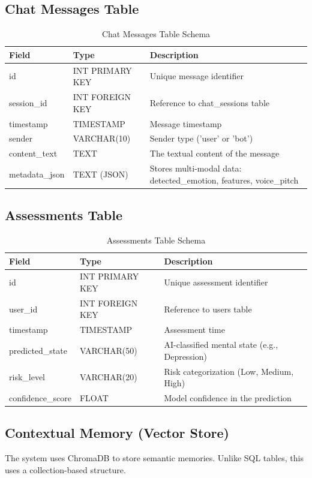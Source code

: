 \subsection{Chat Messages Table}
\begin{table}[H]
\centering
\caption{Chat Messages Table Schema}
\label{tab:messages_table}
\begin{tabular}{|p{3cm}|p{3cm}|p{9cm}|}
\hline
Field & Type & Description \\ \hline
id & INT PRIMARY KEY & Unique message identifier \\ 
session\_id & INT FOREIGN KEY & Reference to chat\_sessions table \\ 
timestamp & TIMESTAMP & Message timestamp \\ 
sender & VARCHAR(10) & Sender type ('user' or 'bot') \\ 
content\_text & TEXT & The textual content of the message \\ 
metadata\_json & TEXT (JSON) & Stores multi-modal data: detected\_emotion, features, voice\_pitch \\ 
\hline
\end{tabular}
\end{table}

\subsection{Assessments Table}
\begin{table}[H]
\centering
\caption{Assessments Table Schema}
\label{tab:assessments_table}
\begin{tabular}{|p{3cm}|p{3cm}|p{9cm}|}
\hline
Field & Type & Description \\ \hline
id & INT PRIMARY KEY & Unique assessment identifier \\ 
user\_id & INT FOREIGN KEY & Reference to users table \\ 
timestamp & TIMESTAMP & Assessment time \\ 
predicted\_state & VARCHAR(50) & AI-classified mental state (e.g., Depression) \\ 
risk\_level & VARCHAR(20) & Risk categorization (Low, Medium, High) \\ 
confidence\_score & FLOAT & Model confidence in the prediction \\ 
\hline
\end{tabular}
\end{table}

\subsection{Contextual Memory (Vector Store)}
The system uses ChromaDB to store semantic memories. Unlike SQL tables, this uses a collection-based structure.

